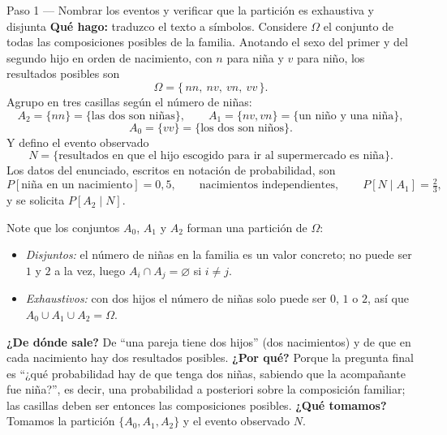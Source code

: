 \documentclass[11pt]{article}
\begin{document}
\begin{sol}

\begin{paso}{Paso 1 --- Nombrar los eventos y verificar que la partici\'on es exhaustiva y disjunta}
\textbf{Qu\'e hago:} traduzco el texto a s\'imbolos. Considere $\Omega$ el conjunto de todas las composiciones posibles de la familia. Anotando el sexo del primer y del segundo hijo en orden de nacimiento, con $n$ para ni\~na y $v$ para ni\~no, los resultados posibles son
\[
\Omega=\{\,nn,\ nv,\ vn,\ vv\,\}.
\]
Agrupo en tres casillas seg\'un el n\'umero de ni\~nas:
\[
A_2=\{nn\}=\{\text{las dos son ni\~nas}\},\qquad
A_1=\{nv,vn\}=\{\text{un ni\~no y una ni\~na}\},
\]
\[
A_0=\{vv\}=\{\text{los dos son ni\~nos}\}.
\]
Y defino el evento observado
\[
N=\{\text{resultados en que el hijo escogido para ir al supermercado es ni\~na}\}.
\]
Los datos del enunciado, escritos en notaci\'on de probabilidad, son
\[
P[\text{ni\~na en un nacimiento}]=0{,}5,\qquad \text{nacimientos independientes},\qquad P[N\mid A_1]=\tfrac23 ,
\]
y se solicita $P[A_2\mid N]$.

\medskip
Note que los conjuntos $A_0$, $A_1$ y $A_2$ forman una partici\'on de $\Omega$:
\begin{itemize}[leftmargin=1.4em]
\item \emph{Disjuntos:} el n\'umero de ni\~nas en la familia es un valor concreto; no puede ser $1$ y $2$ a la vez, luego $A_i\cap A_j=\varnothing$ si $i\neq j$.
\item \emph{Exhaustivos:} con dos hijos el n\'umero de ni\~nas solo puede ser $0$, $1$ o $2$, as\'i que $A_0\cup A_1\cup A_2=\Omega$.
\end{itemize}
\textbf{¿De d\'onde sale?} De ``una pareja tiene dos hijos'' (dos nacimientos) y de que en cada nacimiento hay dos resultados posibles.
\textbf{¿Por qu\'e?} Porque la pregunta final es ``¿qu\'e probabilidad hay de que tenga dos ni\~nas, sabiendo que la acompa\~nante fue ni\~na?'', es decir, una probabilidad a posteriori sobre la composici\'on familiar; las casillas deben ser entonces las composiciones posibles.
\textbf{¿Qu\'e tomamos?} Tomamos la partici\'on $\{A_0,A_1,A_2\}$ y el evento observado $N$.
\end{paso}


\end{sol}
\end{document}
